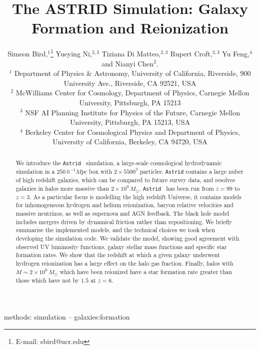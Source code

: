 \documentclass[fleqn,usenatbib]{mnras}
\title[ASTRID Galaxies and Reionization]{The ASTRID Simulation: Galaxy Formation and Reionization}
\author[S.~Bird et al.]{
Simeon Bird,$^{1}$\thanks{E-mail: sbird@ucr.edu}
Yueying Ni,$^{2,3}$
Tiziana Di Matteo,$^{2,3}$
Rupert Croft,$^{2,3}$
Yu Feng,$^{4}$
and Nianyi Chen$^{2}$.
\\
$^{1}$ Department of Physics \& Astronomy, University of California, Riverside, 900 University Ave., Riverside, CA 92521, USA\\
$^{2}$ McWilliams Center for Cosmology, Department of Physics, Carnegie Mellon University, Pittsburgh, PA 15213 \\
$^{3}$ NSF AI Planning Institute for Physics of the Future,
Carnegie Mellon  University, Pittsburgh, PA 15213, USA \\
$^{4}$ Berkeley Center for Cosmological Physics and Department of Physics, University of California, Berkeley, CA 94720, USA
}
\newcommand{\mpch}{\,h^{-1}\unit{Mpc}}
\def\astrid{\texttt{Astrid} }
\def\msun{\, M_{\odot}}
\begin{document}
\label{firstpage}
\pagerange{\pageref{firstpage}--\pageref{lastpage}}
\maketitle

\begin{abstract}
We introduce the \astrid~simulation, a large-scale cosmological hydrodynamic simulation in a $250 \mpch$ box with $2\times 5500^3$ particles. \astrid contains a large nuber of high redshift galaxies, which can be compared to future survey data, and resolves galaxies in halos more massive than $2\times 10^9 \msun$. \astrid~has been run from $z=99$ to $z=3$. As a particular focus is modelling the high redshift Universe, it contains models for inhomogeneous hydrogen and helium reionization, baryon relative velocities and massive neutrinos, as well as supernova and AGN feedback. The black hole model includes mergers driven by dynamical friction rather than repositioning. We briefly summarise the implemented models, and the technical choices we took when developing the simulation code. We validate the model, showing good agreement with observed UV luminosity functions, galaxy stellar mass functions and specific star formation rates. We show that the redshift at which a given galaxy underwent hydrogen reionization has a large effect on the halo gas fraction. Finally, halos with $M \sim 2\times 10^9 \msun$ which have been reionized have a star formation rate greater than those which have not by $1.5$ at $z=6$.
\end{abstract}

\begin{keywords}
methods: simulation
--
galaxies:formation
\end{keywords}


\end{document}
